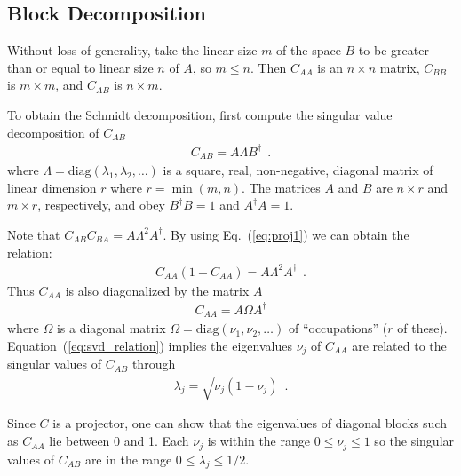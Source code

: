 \documentclass[aps, superscriptaddress, floatfix, onecolumn]{revtex4-2}
\begin{document}
\subsection{Block Decomposition}

Without loss of generality, take the linear size $m$ of the space $B$ to be greater than or equal to linear size $n$ of $A$, so $m \leq n$.
Then $C_{AA}$ is an $n \times n$ matrix, $C_{BB}$ is $m \times m$, and $C_{AB}$ is $n \times m$.

To obtain the Schmidt decomposition, first compute the singular value decomposition of $C_{AB}$
\begin{align}
C_{AB} = A \Lambda B^\dagger \ \ .
\end{align}
where $\Lambda = \text{diag}(\lambda_1, \lambda_2, \ldots)$ is a square, real, non-negative, diagonal matrix of linear dimension $r$ where
$r = \min(m,n)$.
The matrices  $A$ and $B$ are $n \times r$ and $m \times r$, respectively, and obey
$B^\dagger B = 1$ and $A^\dagger A = 1$.

Note that $C_{AB} C_{BA} = A \Lambda^2 A^\dagger$. By using Eq.~(\ref{eq:proj1}) we can obtain the relation:
\begin{align}
C_{AA} (1-C_{AA}) = A \Lambda^2 A^\dagger \ \ . \label{eq:svd_relation}
\end{align}
Thus $C_{AA}$ is also diagonalized by the matrix $A$
\begin{align}
C_{AA} = A \Omega A^\dagger
\end{align}
where $\Omega$ is a diagonal matrix $\Omega = \text{diag}(\nu_1, \nu_2, \ldots)$ of ``occupations'' ($r$ of these). 
Equation~(\ref{eq:svd_relation}) implies the eigenvalues $\nu_j$ of $C_{AA}$ are related to the 
singular values of $C_{AB}$ through 
\begin{align}
\lambda_j = \sqrt{\nu_j (1-\nu_j)} \ \ .
\end{align}

Since $C$ is a projector, one can show that the eigenvalues of diagonal blocks such as $C_{AA}$ lie between 0 and 1. 
Each $\nu_j$ is within the range $0 \leq \nu_j \leq 1$ so the singular values of $C_{AB}$ are in the range $0 \leq \lambda_j \leq 1/2$.
\end{document}
